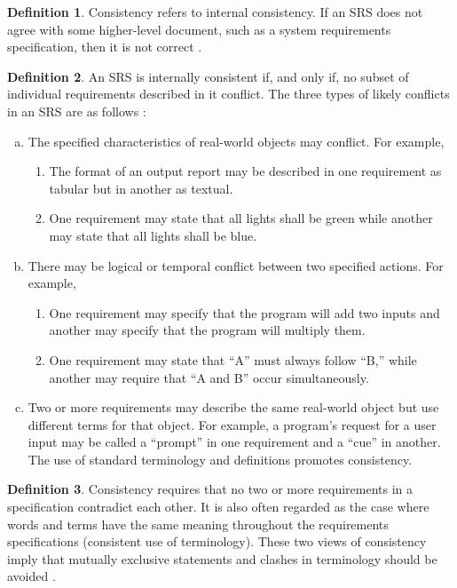 \documentclass[letterpaper, cleveref]{lipics-v2019}
\theoremstyle{definition}
\newtheorem{defn}{Definition}
\begin{document}
\begin{defn}
Consistency refers to internal consistency. If an SRS does not agree with some
higher-level document, such as a system requirements specification, then it is
not correct \citep{IEEE1998}.
\end{defn}

\begin{defn}
 An SRS is internally consistent if, and only if, no subset of individual
 requirements described in it conflict. The three types of likely conflicts
 in an SRS are as follows \citep{IEEE1998}:
 \begin{enumerate}[a)]
 \item The specified characteristics of real-world
 objects may conflict. For example,
 \begin{enumerate}[1)]
 \item The format of an output report may be described
 in one requirement as tabular but in another as textual.
 \item One
 requirement may state that all lights shall be green while another may
 state that all lights shall be blue.
 \end{enumerate}
 \item There may be logical or temporal conflict between two specified actions.
 For example,
 \begin{enumerate}[1)]
 \item One requirement may specify that the program will add two inputs and
 another may specify that the program will multiply them.
 \item One requirement may state that “A” must always follow “B,” while another
 may require that “A and B” occur simultaneously.
 \end{enumerate}
 \item Two or more requirements may describe the same real-world object but use
 different terms for that object. For example, a program’s request for a user
 input may be called a “prompt” in one requirement and a “cue” in another. The
 use of standard terminology and definitions promotes consistency.
 \end{enumerate}
\end{defn}

\begin{defn}
  Consistency requires that no two or more requirements in a specification
  contradict each other. It is also often regarded as the case where words
  and terms have the same meaning throughout the requirements specifications
  (consistent use of terminology). These two views of consistency imply that
  mutually exclusive statements and clashes in terminology should be avoided
  \citep{ZOWGHI2003}.
\end{defn}
\end{document}

